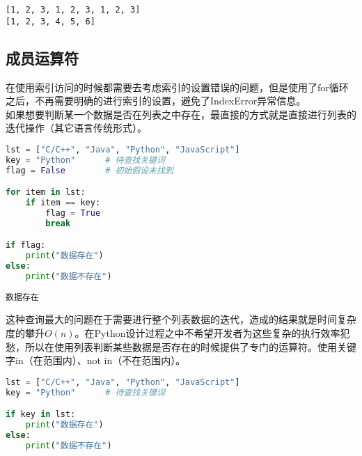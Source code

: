 \begin{tcolorbox}
	\begin{verbatim}
[1, 2, 3, 1, 2, 3, 1, 2, 3]
[1, 2, 3, 4, 5, 6]
\end{verbatim}
\end{tcolorbox}

\vspace{0.5cm}

\subsection{成员运算符}

在使用索引访问的时候都需要去考虑索引的设置错误的问题，但是使用了for循环之后，不再需要明确的进行索引的设置，避免了IndexError异常信息。\\

如果想要判断某一个数据是否在列表之中存在，最直接的方式就是直接进行列表的迭代操作（其它语言传统形式）。\\


\begin{lstlisting}[language=Python]
lst = ["C/C++", "Java", "Python", "JavaScript"]
key = "Python"      # 待查找关键词
flag = False        # 初始假设未找到

for item in lst:
    if item == key:
        flag = True
        break

if flag:
    print("数据存在")
else:
    print("数据不存在")
\end{lstlisting}

\begin{tcolorbox}
	\begin{verbatim}
数据存在
\end{verbatim}
\end{tcolorbox}

这种查询最大的问题在于需要进行整个列表数据的迭代，造成的结果就是时间复杂度的攀升$ O(n) $。在Python设计过程之中不希望开发者为这些复杂的执行效率犯愁，所以在使用列表判断某些数据是否存在的时候提供了专门的运算符。使用关键字in（在范围内）、not in（不在范围内）。\\


\begin{lstlisting}[language=Python]
lst = ["C/C++", "Java", "Python", "JavaScript"]
key = "Python"      # 待查找关键词

if key in lst:
    print("数据存在")
else:
    print("数据不存在")
\end{lstlisting}

